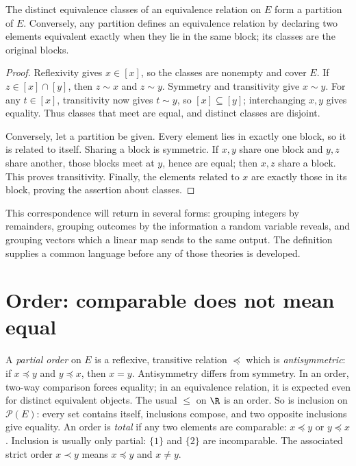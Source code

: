 \begin{theorem}\label{thm:lang-partition}
The distinct equivalence classes of an equivalence relation on $E$ form a partition
of $E$. Conversely, any partition defines an equivalence relation by declaring
two elements equivalent exactly when they lie in the same block; its classes are
the original blocks.
\end{theorem}
\begin{proof}
Reflexivity gives $x\in[x]$, so the classes are nonempty and cover $E$.
If $z\in[x]\cap[y]$, then $z\sim x$ and $z\sim y$. Symmetry and transitivity
give $x\sim y$. For any $t\in[x]$, transitivity now gives $t\sim y$,
so $[x]\subseteq[y]$; interchanging $x,y$ gives equality. Thus classes that meet
are equal, and distinct classes are disjoint.

Conversely, let a partition be given. Every element lies in exactly one block,
so it is related to itself. Sharing a block is symmetric. If $x,y$ share one
block and $y,z$ share another, those blocks meet at $y$, hence are equal;
then $x,z$ share a block. This proves transitivity. Finally, the elements
related to $x$ are exactly those in its block, proving the assertion about classes.
\end{proof}

This correspondence will return in several forms: grouping integers by remainders,
grouping outcomes by the information a random variable reveals, and grouping vectors
which a linear map sends to the same output. The definition supplies a common language
before any of those theories is developed.

\section{Order: comparable does not mean equal}

A \emph{partial order} on $E$ is a reflexive, transitive relation $\preceq$
which is \emph{antisymmetric}: if $x\preceq y$ and $y\preceq x$, then $x=y$.
Antisymmetry differs from symmetry. In an order, two-way comparison forces equality;
in an equivalence relation, it is expected even for distinct equivalent objects.
The usual $\le$ on $\R$ is an order. So is inclusion on $\mathcal P(E)$:
every set contains itself, inclusions compose, and two opposite inclusions give equality.
An order is \emph{total} if any two elements are comparable: $x\preceq y$ or
$y\preceq x$. Inclusion is usually only partial: $\{1\}$ and $\{2\}$ are incomparable.
The associated strict order $x\prec y$ means $x\preceq y$ and $x\ne y$.

